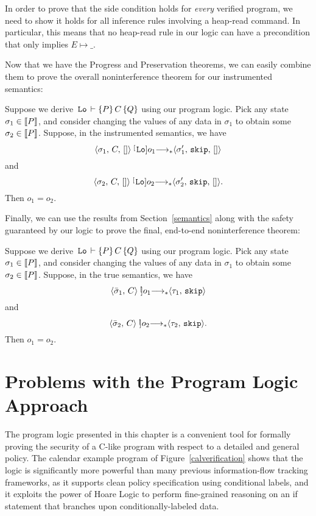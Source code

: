 In order to prove that the side condition holds for \emph{every} verified
program, we need to show it holds for all inference rules involving a heap-read command.
In particular, this means that no heap-read rule in our logic can have a precondition
that only implies $E \mapsto \_$.

Now that we have the Progress and Preservation theorems, we can easily combine them to
prove the overall noninterference theorem for our instrumented semantics:

\begin{thm}
Suppose we derive $\, \text{\tt{Lo}} \, \vdash \{P\} \, C \, \{Q\}$ using our program logic. Pick any state
$\sigma_1 \in \llbracket P \rrbracket$, and consider changing the values of any \hi{} data in
$\sigma_1$ to obtain some $\sigma_2 \in \llbracket P \rrbracket$. Suppose, in the instrumented
semantics, we have
\[\langle \sigma_1, \, C, \, [] \rangle \stackrel[\!\!\text{\tt{Lo}}]{o_1}{\longrightarrow_{*}} \langle \sigma_1', \, \text{\tt{skip}}, \, [] \rangle\]
and
\[\langle \sigma_2, \, C, \, [] \rangle \stackrel[\!\!\text{\tt{Lo}}]{o_2}{\longrightarrow_{*}} \langle \sigma_2', \, \text{\tt{skip}}, \, [] \rangle.\]
Then $o_1 = o_2$.
\end{thm}

Finally, we can use the results from Section~\ref{semantics} along with the
safety guaranteed by our logic to prove the final, end-to-end noninterference
theorem:

\begin{thm}
Suppose we derive $\, \text{\tt{Lo}} \, \vdash \{P\} \, C \, \{Q\}$ using our program logic. Pick any state
$\sigma_1 \in \llbracket P \rrbracket$, and consider changing the values of any \hi{} data in
$\sigma_1$ to obtain some $\sigma_2 \in \llbracket P \rrbracket$. Suppose, in the true semantics,
we have
\[\langle \bar{\sigma}_1, \, C \rangle \stackrel[\!\!]{o_1}{\longrightarrow_{*}} \langle \tau_1, \, \text{\tt{skip}} \rangle\]
and
\[\langle \bar{\sigma}_2, \, C \rangle \stackrel[\!\!]{o_2}{\longrightarrow_{*}} \langle \tau_2, \, \text{\tt{skip}} \rangle.\]
Then $o_1 = o_2$.
\end{thm}


\section{Problems with the Program Logic Approach}
\label{logic-problems}

The program logic presented in this chapter is a convenient tool for formally
proving the security of a C-like program with respect to a detailed and general
policy. The calendar example program of Figure~\ref{calverification} shows that 
the logic is significantly more powerful than many previous information-flow
tracking frameworks, as it supports clean policy specification using conditional 
labels, and it exploits the power of Hoare Logic to perform fine-grained
reasoning on an if statement that branches upon conditionally-labeled data.

